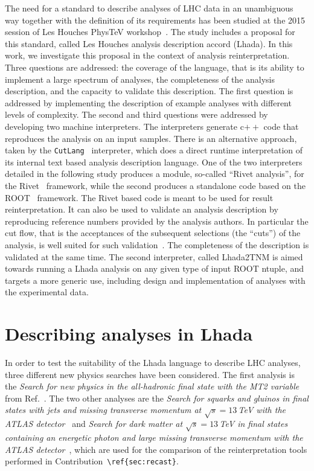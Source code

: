 \documentclass[11pt]{cernrep}
\begin{document}
The need for a standard to describe analyses of LHC data in an unambiguous way together with the definition of its requirements has been studied at the 2015 session of Les Houches PhysTeV workshop~\cite{Brooijmans:2016vro}. The study includes a proposal for this standard, called Les Houches analysis description accord ({\sc Lhada}). In this work, we investigate this proposal in the context of analysis reinterpretation. Three questions are addressed: the coverage of the language, that is its ability to implement a large spectrum of analyses, the completeness of the analysis description, and the capacity to validate this description. The first question is addressed by implementing the description of example analyses with different levels of complexity. The second and third questions were addressed by developing two machine interpreters. The interpreters generate c$++$ code that reproduces the analysis on an input samples. There is an alternative approach, taken by the {\tt CutLang}~\cite{Sekmen:2018ehb} interpreter, which does a direct runtime interpretation of its internal text based analysis description language.  One of the two interpreters detailed in the following study produces a module, so-called ``Rivet analysis'', for the {\sc Rivet}~\cite{Buckley:2010ar} framework, while the second produces a standalone code based on the ROOT~\cite{Brun:1997pa} framework. The {\sc Rivet} based code is meant to be used for result reinterpretation. It can also be used to validate an analysis description by reproducing reference numbers provided by the analysis authors. In particular the cut flow, that is the acceptances of the subsequent selections (the ``cuts'') of the analysis, is well suited for such validation~\cite{Kraml:2012sg}. The completeness of the description is validated at the same time. The second interpreter, called {\sc Lhada2TNM} is aimed towards running a {\sc Lhada} analysis on any given type of input ROOT ntuple, and targets a more generic use, including design and implementation of analyses with the experimental data.

\section{Describing analyses in {\sc Lhada}}

In order to test the suitability of the {\sc Lhada} language to describe LHC analyses, three different new physics searches have been considered. The first analysis is the {\em Search for new physics in the all-hadronic final state with the MT2 variable} from Ref.~\cite{CMS:2016xva}. The two other analyses are the {\em Search for squarks and gluinos in final states with jets and missing transverse momentum at $\sqrt{s} = 13\,$TeV  with the ATLAS detector}~\cite{Aaboud:2016zdn} and {\em Search for dark matter at $\sqrt{s}=13\,$TeV in final states containing an energetic photon and large missing transverse momentum with the ATLAS detector}~\cite{Aaboud:2017dor}, which are used for the comparison of the reinterpretation tools performed in Contribution~\verb|\ref{sec:recast}|.
\end{document}
